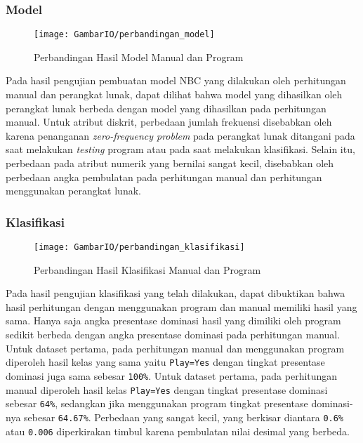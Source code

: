 \subsubsection{Model}

\begin{figure}[H]
	\centering
	\texttt{[image: GambarIO/perbandingan\_model]}
	\caption[Perbandingan Hasil Model Manual dan Program]{Perbandingan Hasil Model Manual dan Program}
	\label{fig:Perbandingan Hasil Model Manual dan Program}
\end{figure}

Pada hasil pengujian pembuatan model NBC yang dilakukan oleh perhitungan manual dan perangkat lunak, dapat dilihat bahwa model yang dihasilkan oleh perangkat lunak berbeda dengan model yang dihasilkan pada perhitungan manual. Untuk atribut diskrit, perbedaan jumlah frekuensi disebabkan oleh karena penanganan \textit{zero-frequency problem} pada perangkat lunak ditangani pada saat melakukan \textit{testing} program atau pada saat melakukan klasifikasi. Selain itu, perbedaan pada atribut numerik yang bernilai sangat kecil, disebabkan oleh perbedaan angka pembulatan pada perhitungan manual dan perhitungan menggunakan perangkat lunak.

\subsubsection{Klasifikasi}

\begin{figure}[H]
	\centering
	\texttt{[image: GambarIO/perbandingan\_klasifikasi]}
	\caption[Perbandingan Hasil Klasifikasi Manual dan Program]{Perbandingan Hasil Klasifikasi Manual dan Program}
	\label{fig:Perbandingan Hasil Klasifikasi Manual dan Program}
\end{figure}

Pada hasil pengujian klasifikasi yang telah dilakukan, dapat dibuktikan bahwa hasil perhitungan dengan menggunakan program dan manual memiliki hasil yang sama. Hanya saja angka presentase dominasi hasil yang dimiliki oleh program sedikit berbeda dengan angka presentase dominasi pada perhitungan manual. Untuk dataset pertama, pada perhitungan manual dan menggunakan program diperoleh hasil kelas yang sama yaitu \texttt{Play=Yes} dengan tingkat presentase dominasi juga sama sebesar \texttt{100\%}. Untuk dataset pertama, pada perhitungan manual diperoleh hasil kelas \texttt{Play=Yes} dengan tingkat presentase dominasi sebesar \texttt{64\%}, sedangkan jika menggunakan program tingkat presentase dominasi-nya sebesar \texttt{64.67\%}. Perbedaan yang sangat kecil, yang berkisar diantara \texttt{0.6\%} atau \texttt{0.006} diperkirakan timbul karena pembulatan nilai desimal yang berbeda.

